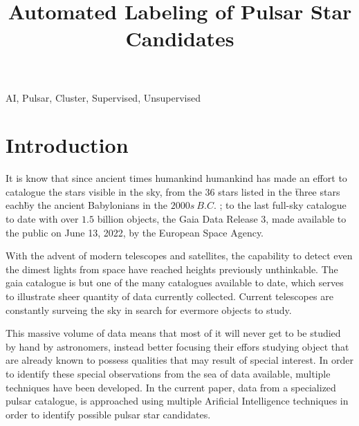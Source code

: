 \documentclass[conference]{IEEEtran}
\begin{document}
\title{Automated Labeling of Pulsar Star Candidates}

\author{
    }

\maketitle

\begin{abstract}
    \todo{}
\end{abstract}

\begin{IEEEkeywords}
    AI, Pulsar, Cluster, Supervised, Unsupervised
\end{IEEEkeywords}

\section{Introduction}
It is know that since ancient times humankind humankind has made an effort to
catalogue the stars visible in the sky, from the $36$ stars listed in the
\"three stars each\" by the ancient Babylonians in the $2000s\ B.C.$
\cite{astronomy:history:dick}; to the last full-sky catalogue to date with over
$1.5$ billion objects, the Gaia Data Release 3\cite{gaia:dr3}, made available
to the public on June 13, 2022, by the European Space Agency.

With the advent of modern telescopes and satellites, the capability to detect
even the dimest lights from space have reached heights previously unthinkable.
The gaia catalogue is but one of the many catalogues available to date, which
serves to illustrate sheer quantity of data currently collected. Current
telescopes are constantly surveing the sky in search for evermore objects to study.

This massive volume of data means that most of it will never get to be studied
by hand by astronomers, instead better focusing their effors studying object 
that are already known to possess qualities that may result of special interest.
In order to identify these special observations from the sea of data available,
multiple techniques have been developed.\cite{pulsar:dataset:oxford} In the 
current paper, data from a specialized pulsar catalogue\cite{pulsar:dataset},
is approached using multiple Arificial Intelligence techniques in order to
identify possible pulsar star candidates.
\end{document}
